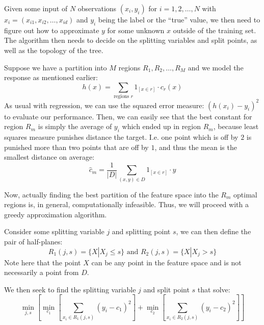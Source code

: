     Given some input of $N$ observations $(x_i,y_i)$ for $i=1,2,\dots,N$ with 
    $x_i = (x_{i1}, x_{i2},\dots,x_{id})$ and $y_i$ being the label or the 
    ``true'' value, we then need to figure out how to approximate $y$ for some 
    unknown $x$ outside of the training set. The algorithm then needs to decide 
    on the splitting variables and split points, as well as the topology of the 
    tree.
    
    Suppose we have a partition into $M$ regions $R_1, R_2, \dots, R_M$ and we 
    model the response as mentioned earlier:
    \begin{equation*}
        h(x)=\sum_{\text{regions } r}1_{[x\in r]} \cdot c_r(x)
    \end{equation*}
    As usual with regression, we can use the squared error measure: $(h(x_i) 
    -y_i)^2$ to evaluate our performance. Then, we can easily see that the best 
    constant for region $R_m$ is simply the average of $y_i$ which ended up in 
    region $R_m$, because least squares measure punishes distance the target. 
    I.e. one point which is off by $2$ is punished more than two points that 
    are off by $1$, and thus the mean is the smallest distance on average:
    \begin{equation*}
        \hat{c}_m=\frac{1}{|D|}\sum_{(x,y) \in D}1_{[x\in r]} \cdot y
    \end{equation*}
    
    Now, actually finding the best partition of the feature space into the 
    $R_m$ optimal regions is, in general, computationally infeasible. Thus, we 
    will proceed with a greedy approximation algorithm.
    
    Consider some splitting variable $j$ and splitting point $s$, we can then 
    define the pair of half-planes:
    \begin{equation*}
        R_1(j,s)=\{X|X_j \leq s\} \text{ and } R_2(j,s)=\{X|X_j > s\}
    \end{equation*}
    Note here that the point $X$ can be any point in the feature space and is 
    not necessarily a point from $D$.
    
    We then seek to find the splitting variable $j$ and split point $s$ that 
    solve:
    \begin{equation*}
        \min_{j,s}\left[\min_{c_1}\left[\sum_{x_i\in 
        R_1(j,s)}(y_i-c_1)^2\right] + \min_{c_2}\left[\sum_{x_i \in 
        R_2(j,s)}(y_i-c_2)^2\right]\right]
    \end{equation*}
    

